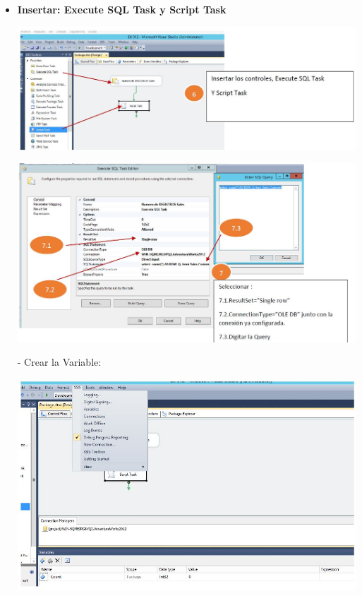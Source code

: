 \begin{itemize}
    \item \textbf{Insertar: Execute SQL Task y Script Task}

	\begin{center}
	\includegraphics[width=17cm]{./Imagenes/15}
	\end{center}	

	\begin{center}
	\includegraphics[width=17cm]{./Imagenes/16}
	\end{center}	

- Crear la Variable:

	\begin{center}
	\includegraphics[width=15cm]{./Imagenes/17}
	\end{center}	


\end{itemize}
